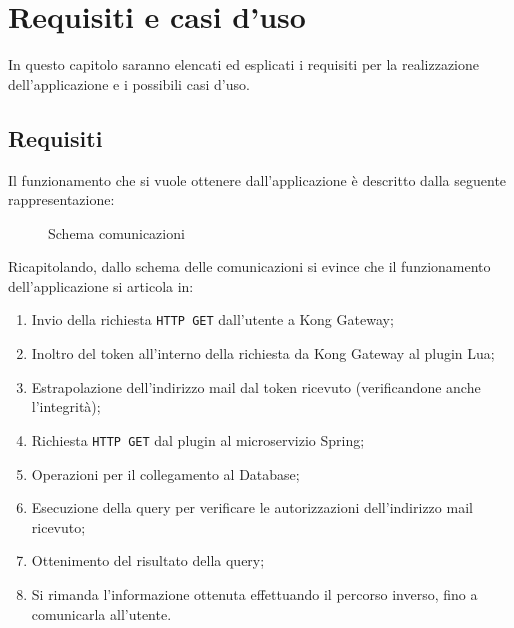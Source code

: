 \chapter{Requisiti e casi d'uso}\label{chap:requisiti}
In questo capitolo saranno elencati ed esplicati i requisiti per la realizzazione dell'applicazione e i possibili casi d'uso.

\section{Requisiti}\label{sec:requisiti}
Il funzionamento che si vuole ottenere dall'applicazione è descritto dalla seguente rappresentazione:

\begin{figure}[H]
    \centering
    \caption{Schema comunicazioni}
    \label{fig:comunicationscheme}
\end{figure}

Ricapitolando, dallo schema delle comunicazioni si evince che il funzionamento dell'applicazione si articola in:
\begin{enumerate}
\item Invio della richiesta \texttt{HTTP GET} dall'utente a Kong Gateway;
\item Inoltro del token all'interno della richiesta da Kong Gateway al plugin Lua;
\item Estrapolazione dell'indirizzo mail dal token ricevuto (verificandone anche l'integrità);
\item Richiesta \texttt{HTTP GET} dal plugin al microservizio Spring;
\item Operazioni per il collegamento al Database;
\item Esecuzione della query per verificare le autorizzazioni dell'indirizzo mail ricevuto;
\item Ottenimento del risultato della query;
\item Si rimanda l'informazione ottenuta effettuando il percorso inverso, fino a comunicarla all'utente. 
\end{enumerate}


